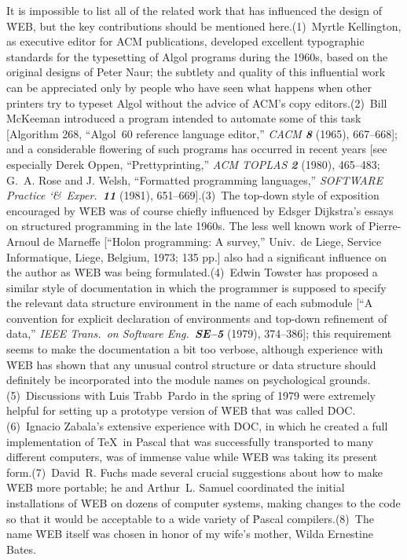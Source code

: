 It is impossible to list all of the related work that has influenced the
design of \.{WEB}, but the key contributions should be mentioned
here.\quad (1)~Myrtle Kellington, as executive editor for ACM
publications, developed excellent typographic standards for the
typesetting of Algol programs during the 1960s, based on the original
designs of Peter Naur; the subtlety and quality of this influential work
can be appreciated only by people who have seen what happens when other
printers try to typeset Algol without the advice of ACM's copy
editors.\quad(2)~Bill McKeeman introduced a program intended to automate
some of this task [Algorithm 268, ``Algol~60 reference language editor,''
{\sl CACM \bf8} (1965), 667--668]; and a considerable flowering of such
programs has occurred in recent years [see especially Derek Oppen,
``Prettyprinting,'' {\sl ACM TOPLAS \bf2} (1980), 465--483; G.~A.
Rose and
J.
Welsh, ``Formatted programming languages,'' {\sl SOFTWARE Practice
\char`\&\ Exper.\ \bf11} (1981), 651--669].\quad(3)~The top-down style of
exposition encouraged by \.{WEB} was of course chiefly influenced by Edsger
Dijkstra's essays on structured programming in the late 1960s.
The less
well known work of Pierre-Arnoul de Marneffe [``Holon programming: A
survey,'' Univ.\ de Liege, Service Informatique, Liege, Belgium, 1973; 135
pp.\null] also had a significant influence on the author as \.{WEB} was
being formulated.\quad(4)~Edwin Towster has proposed a similar style of
documentation in which the programmer is supposed to specify the relevant
data structure environment in the name of each submodule [``A convention
for explicit declaration of environments and top-down refinement of
data,'' {\sl IEEE Trans.\ on Software Eng.\ \bf SE--5} (1979), 374--386];
this requirement seems to make the documentation a bit too verbose,
although experience with \.{WEB} has shown that any unusual control
structure or data structure should definitely be incorporated into the
module names on psychological grounds.\quad(5)~Discussions with Luis
Trabb~Pardo in the spring of 1979 were extremely helpful for setting up a
prototype version of \.{WEB} that was called \.{DOC}.\quad (6)~Ignacio
Zabala's extensive experience with \.{DOC}, in which he created a full
implementation of \TeX\ in {Pascal} that was successfully transported to
many different computers, was of immense value while \.{WEB} was taking
its present form.\quad(7)~David~R.
Fuchs made several crucial suggestions
about how to make \.{WEB} more portable; he and Arthur~L.
Samuel
coordinated the initial installations of \.{WEB} on dozens of computer
systems, making changes to the code so that it would be acceptable to
a wide variety of \.{Pascal} compilers.\quad(8)~The name \.{WEB} itself
was chosen in honor of my wife's mother, Wilda Ernestine Bates.

